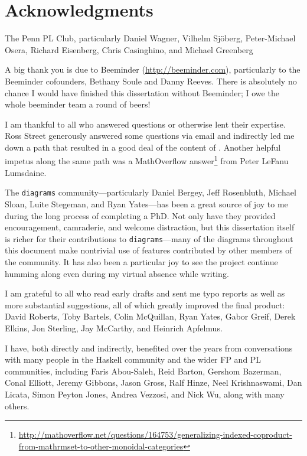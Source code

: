 
\newpage
\chapter*{Acknowledgments}

The Penn PL Club, particularly Daniel Wagner, Vilhelm Sj\"oberg,
Peter-Michael Osera, Richard Eisenberg, Chris Casinghino, and Michael
Greenberg 

A big thank you is due to Beeminder (\url{http://beeminder.com}),
particularly to the Beeminder cofounders, Bethany Soule and Danny
Reeves.  There is absolutely no chance I would have finished this
dissertation without Beeminder; I owe the whole beeminder team a round
of beers!

I am thankful to all who answered questions or otherwise lent their
expertise.  Ross Street generously answered some questions via email
and indirectly led me down a path that resulted in a good deal of the
content of .  Another helpful impetus along the
same path was a MathOverflow answer\footnote{\url{http://mathoverflow.net/questions/164753/generalizing-indexed-coproduct-from-mathrmset-to-other-monoidal-categories}} from Peter LeFanu Lumsdaine.

The \texttt{diagrams} community---particularly Daniel Bergey, Jeff
Rosenbluth, Michael Sloan, Luite Stegeman, and Ryan Yates---has been a
great source of joy to me during the long process of completing a PhD.
Not only have they provided encouragement, camraderie, and welcome
distraction, but this dissertation itself is richer for their
contributions to \texttt{diagrams}---many of the diagrams throughout
this document make nontrivial use of features contributed by other
members of the community.  It has also been a particular joy to see
the project continue humming along even during my virtual absence
while writing.

I am grateful to all who read early drafts and sent me typo reports as
well as more substantial suggestions, all of which greatly improved
the final product: David Roberts, Toby Bartels, Colin McQuillan, Ryan
Yates, Gabor Greif, Derek Elkins, Jon Sterling, Jay McCarthy, and
Heinrich Apfelmus.

I have, both directly and indirectly, benefited over the years from
conversations with many people in the Haskell community and the wider
FP and PL communities, including Faris Abou-Saleh, Reid Barton,
Gershom Bazerman, Conal Elliott, Jeremy Gibbons, Jason Gross, Ralf
Hinze, Neel Krishnaswami, Dan Licata, Simon Peyton Jones, Andrea
Vezzosi, and Nick Wu, along with many others.

